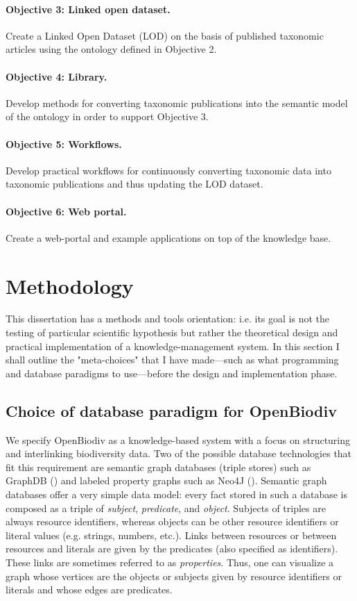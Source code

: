\paragraph{Objective 3: Linked open dataset.} Create a Linked Open Dataset (LOD) on the basis of published taxonomic articles using the ontology defined in Objective 2.
\paragraph{Objective 4: Library.} Develop methods for converting taxonomic publications into the semantic model of the ontology in order to support Objective 3.
\paragraph{Objective 5: Workflows.} Develop practical workflows for continuously converting taxonomic data into taxonomic publications and thus updating the LOD dataset.
\paragraph{Objective 6: Web portal.} Create a web-portal and example applications on top of the knowledge base.

\section*{Methodology}

This dissertation has a methods and tools orientation: i.e. its goal is not the testing of particular scientific hypothesis but rather the theoretical design and practical implementation of a knowledge-management system. In this section I shall outline the "meta-choices" that I have made---such as what programming and database paradigms to use---before the design and implementation phase. 

\subsection*{Choice of database paradigm for OpenBiodiv}

We specify OpenBiodiv as a knowledge-based system with a focus on structuring and interlinking biodiversity data. Two of the possible database technologies that fit this requirement are semantic graph databases (triple stores) such as GraphDB (\cite{ontotext_graphdb_2018}) and labeled property graphs such as Neo4J (\cite{neo4j_developers_neo4j_2012}).  Semantic graph databases offer a very simple data model: every fact stored in such a database is composed as a triple of \emph{subject}, \emph{predicate}, and \emph{object}. Subjects of triples are always resource identifiers, whereas objects can be other resource identifiers or literal values (e.g. strings, numbers, etc.).  Links between resources or between resources and literals are given by the predicates (also specified as identifiers). These links are sometimes referred to as \emph{properties}. Thus, one can visualize a graph whose vertices are the objects or subjects given by resource identifiers or literals and whose edges are predicates.

